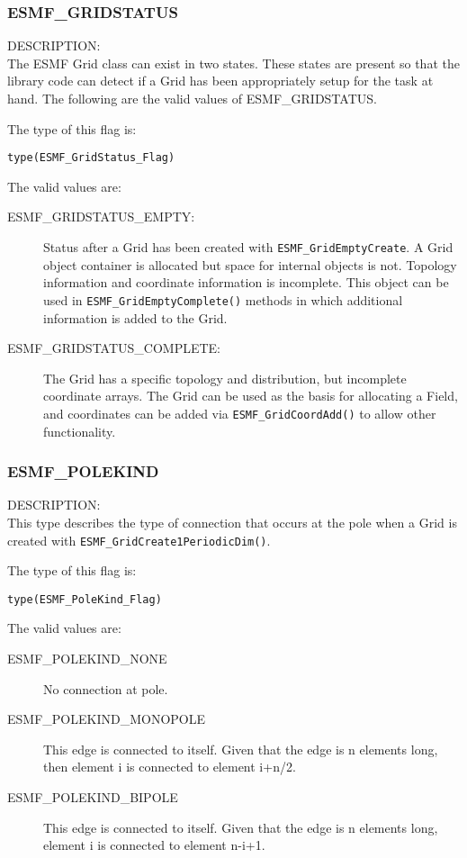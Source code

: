 \subsubsection{ESMF\_GRIDSTATUS}
\label{const:gridstatus}

{\sf DESCRIPTION:\\}
The ESMF Grid class can exist in two states. These states are
present so that the library code can detect if a Grid has been
appropriately setup for the task at hand. The following
are the valid values of ESMF\_GRIDSTATUS.

The type of this flag is:

{\tt type(ESMF\_GridStatus\_Flag)}

The valid values are:
\begin{description}
\item [ESMF\_GRIDSTATUS\_EMPTY:] Status after a Grid has been created with 
      {\tt ESMF\_GridEmptyCreate}.  A Grid object container is allocated but
      space for internal objects is not.  Topology information and coordinate
      information is incomplete.  This object can be used in {\tt ESMF\_GridEmptyComplete()}
      methods in which additional information is added to the Grid.
\item [ESMF\_GRIDSTATUS\_COMPLETE:] The Grid has a specific topology and
      distribution, but incomplete coordinate arrays.  The Grid can be used
      as the basis for allocating a Field, and coordinates can be added
      via {\tt ESMF\_GridCoordAdd()} to allow other functionality. 
\end{description}


\subsubsection{ESMF\_POLEKIND}
\label{const:polekind}

{\sf DESCRIPTION:\\}
This type describes the type of connection that occurs at the pole when a Grid is 
created with {\tt ESMF\_GridCreate1PeriodicDim()}.

The type of this flag is:

{\tt type(ESMF\_PoleKind\_Flag)}

The valid values are:
\begin{description}
\item [ESMF\_POLEKIND\_NONE] No connection at pole.

\item [ESMF\_POLEKIND\_MONOPOLE] This edge is connected to itself. Given
that the edge is n elements long, then element i is connected to
element i+n/2.

\item [ESMF\_POLEKIND\_BIPOLE] This edge is connected to itself. Given
that the edge is n elements long, element i is connected to element n-i+1.
\end{description}


